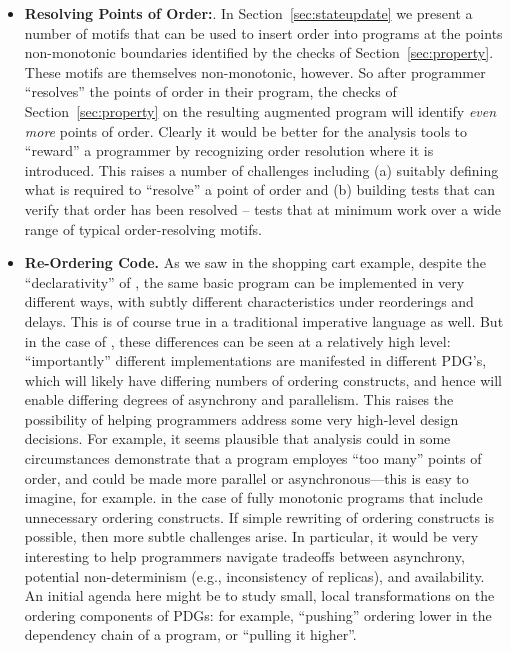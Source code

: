 \begin{itemize}
    \item {\bf Resolving Points of Order:}.  In Section~\ref{sec:stateupdate} we present a number of motifs that can be used to insert order into programs at the points non-monotonic boundaries identified by the checks of Section~\ref{sec:property}.  These motifs are themselves non-monotonic, however.  So after programmer ``resolves'' the points of order in their program, the checks of Section~\ref{sec:property} on the resulting augmented program will identify {\em even more} points of order.  Clearly it would be better for the analysis tools to ``reward'' a programmer by recognizing order resolution where it is introduced.  This raises a number of challenges including (a) suitably defining what is required to ``resolve'' a point of order and (b) building tests that can verify that order has been resolved -- tests that at minimum work over a wide range of typical order-resolving motifs.    
    
    \item {\bf Re-Ordering Code.} As we saw in the shopping cart example, despite the ``declarativity'' of \lang, the same basic program can be implemented in very different ways, with subtly different characteristics under reorderings and delays.  This is of course true in a traditional imperative language as well.  But in the case of \lang, these differences can be seen at a relatively high level: ``importantly'' different implementations are manifested in different PDG's, which will likely have differing numbers of ordering constructs, and hence will enable differing degrees of asynchrony and parallelism.  This raises the possibility of helping programmers address some very high-level design decisions.  For example, it seems plausible that analysis could in some circumstances demonstrate that a program employes ``too many'' points of order, and could be made more parallel or asynchronous---this is easy to imagine, for example. in the case of fully monotonic programs that include unnecessary ordering constructs.  If simple rewriting of ordering constructs is possible, then more subtle challenges arise.  In particular, it would be very interesting to help programmers navigate tradeoffs between asynchrony, potential non-determinism (e.g., inconsistency of replicas), and availability.  An initial agenda here might be to study small, local transformations on the ordering components of PDGs: for example, ``pushing'' ordering lower in the dependency chain of a program, or ``pulling it higher''.


\end{itemize}
